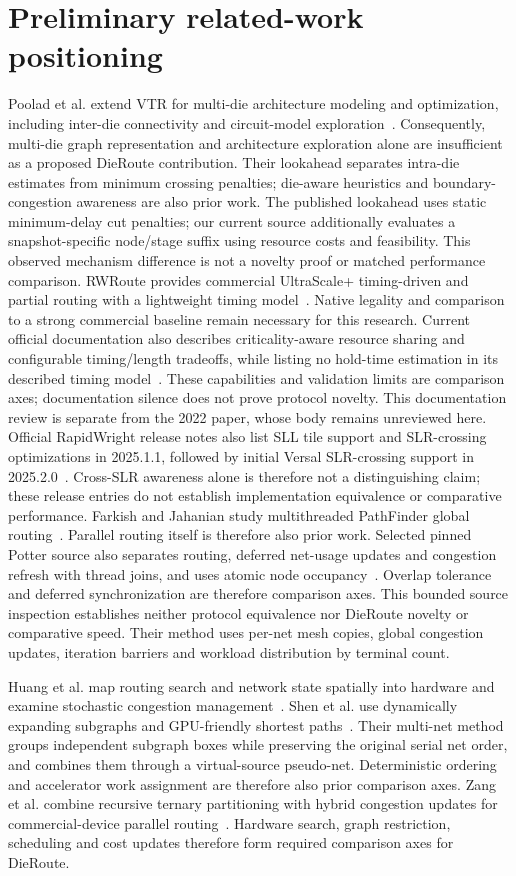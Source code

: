 \documentclass[10pt]{article}
\begin{document}
\section{Preliminary related-work positioning}
Poolad et al. extend VTR for multi-die architecture modeling and optimization,
including inter-die connectivity and circuit-model exploration~\cite{multidie}.
Consequently, multi-die graph representation and architecture exploration alone
are insufficient as a proposed DieRoute contribution.
Their lookahead separates intra-die estimates from minimum crossing penalties;
die-aware heuristics and boundary-congestion awareness are also prior work.
The published lookahead uses static minimum-delay cut penalties; our current
source additionally evaluates a snapshot-specific node/stage suffix using
resource costs and feasibility. This observed mechanism difference is not a
novelty proof or matched performance comparison.
RWRoute provides commercial UltraScale+ timing-driven and partial routing with
a lightweight timing model~\cite{rwroute}. Native legality and comparison to a
strong commercial baseline remain necessary for this research.
Current official documentation also describes criticality-aware resource
sharing and configurable timing/length tradeoffs, while listing no hold-time
estimation in its described timing model~\cite{rwdocs}. These capabilities
and validation limits are comparison axes; documentation silence does not
prove protocol novelty. This documentation review is separate from the
2022 paper, whose body remains unreviewed here.
Official RapidWright release notes also list SLL tile support and SLR-crossing
optimizations in 2025.1.1, followed by initial Versal SLR-crossing support in
2025.2.0~\cite{rwrelease}. Cross-SLR awareness alone is therefore not a
distinguishing claim; these release entries do not establish implementation
equivalence or comparative performance.
Farkish and Jahanian study multithreaded PathFinder global routing~\cite{parallel}.
Parallel routing itself is therefore also prior work.
Selected pinned Potter source also separates routing, deferred net-usage
updates and congestion refresh with thread joins, and uses atomic node
occupancy~\cite{potterrepo}. Overlap tolerance and deferred synchronization
are therefore comparison axes. This bounded source inspection establishes
neither protocol equivalence nor DieRoute novelty or comparative speed.
Their method uses per-net mesh copies, global congestion updates, iteration
barriers and workload distribution by terminal count.

Huang et al. map routing search and network state spatially into hardware
and examine stochastic congestion management~\cite{spatial}.
Shen et al. use dynamically expanding subgraphs and GPU-friendly shortest
paths~\cite{gpu}. Their multi-net method groups independent subgraph boxes
while preserving the original serial net order, and combines them through
a virtual-source pseudo-net. Deterministic ordering and accelerator work
assignment are therefore also prior comparison axes. Zang et al. combine recursive ternary partitioning with
hybrid congestion updates for commercial-device parallel routing~\cite{commercialparallel}.
Hardware search, graph restriction, scheduling and cost updates therefore
form required comparison axes for DieRoute.
\end{document}

